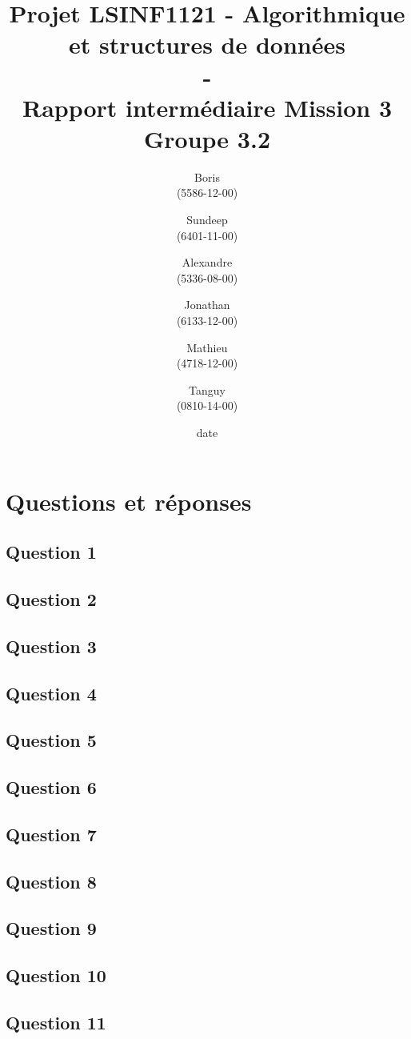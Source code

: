 \documentclass[11pt]{article}
\title{\textbf{Projet LSINF1121 -  Algorithmique et structures de données\\ - \\ Rapport intermédiaire Mission 3} \\ {\large Groupe 3.2}}
\author{Boris \bsc{Dehem} \\(5586-12-00)\and Sundeep \bsc{Dhillon} \\(6401-11-00)\and Alexandre \bsc{Hauet} \\ (5336-08-00) \and Jonathan \bsc{Powell}\\(6133-12-00)\and Mathieu \bsc{Rosar} \\ (4718-12-00)\and Tanguy \bsc{Vaessen} \\ (0810-14-00)}
\date{date}
\date{\vspace*{25mm}
\texttt{[image: logo.jpg]}\\
		\vspace*{30mm}
		\begin{center}
		Année académique 2014-2015 \\	
		\end{center}}
\begin{document}
\thispagestyle{empty}

\maketitle
\thispagestyle{empty}
\section*{Questions et réponses}

\subsection*{Question 1}


\subsection*{Question 2}


\subsection*{Question 3}


\subsection*{Question 4}


\subsection*{Question 5}


\subsection*{Question 6}


\subsection*{Question 7}


\subsection*{Question 8}


\subsection*{Question 9}


\subsection*{Question 10}


\subsection*{Question 11}

\end{document}
